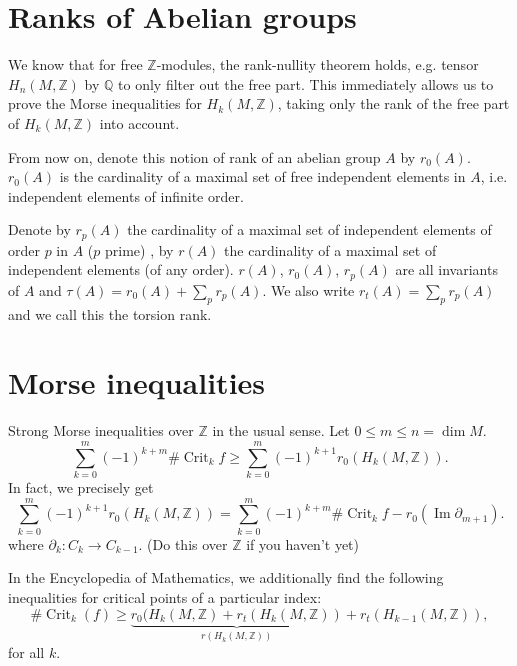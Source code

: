 \documentclass[a4paper]{article}
\newcommand\Z{\mathbb Z}
\newcommand\Q{\mathbb Q}
\DeclareMathOperator{\Crit}{Crit}
\begin{document}
\section{Ranks of Abelian groups}
We know that for free $\Z$-modules, the rank-nullity theorem holds, e.g. tensor $H_n(M, \Z)$ by $\Q$ to only filter out the free part.
This immediately allows us to prove the Morse inequalities for $H_k(M, \Z)$, taking only the rank of the free part of $H_k(M,\Z)$ into account.

From now on, denote this notion of  rank of an abelian group $A$ by  $r_0(A)$.  $r_0(A)$ is the cardinality of a maximal set of free independent elements in $A$, i.e. independent elements of infinite order.

Denote by $r_p(A)$ the cardinality of a maximal set of independent elements of order  $p$ in  $A$ ($p$ prime)
, by $r(A)$ the cardinality of a maximal set of independent elements (of any order).
$r(A)$,  $ r_0(A)$, $r_p(A)$ are all invariants of  $A$ and  $\tau(A) = r_0(A) + \sum_{p} r_p(A)$.
We also write $r_t(A) = \sum_p r_p(A)$ and we call this the torsion rank.


\section{Morse inequalities}
Strong Morse inequalities over $\Z$ in the usual sense. Let $0 \le  m \le  n = \dim M$.
\[
    \sum_{k=0}^{m} (-1)^{k+m} \# \Crit_k f \ge  \sum_{k=0}^{m} (-1)^{k+1} r_0(H_k(M, \Z))
.\] 
In fact, we precisely get
\[
    \sum_{k=0}^{m} (-1)^{k+1} r_0(H_k(M, \Z)) = \sum_{k=0}^{m} (-1)^{k+m} \# \Crit_k f - r_0 (\operatorname{Im} \partial_{m+1})
.\] 
where $\partial_k: C_k \to  C_{k-1}$. (Do this over $\Z$ if you haven't yet)

In the Encyclopedia of Mathematics, we additionally find the following inequalities for critical points of a particular index:
\[
    \# \Crit_k (f) \ge  \underbrace{r_0(H_k(M, \Z) + r_t(H_k(M, \Z))}_{r(H_k(M, \Z))} + r_t(H_{k-1}(M, \Z))
,\] 
for all $k$.
\end{document}
